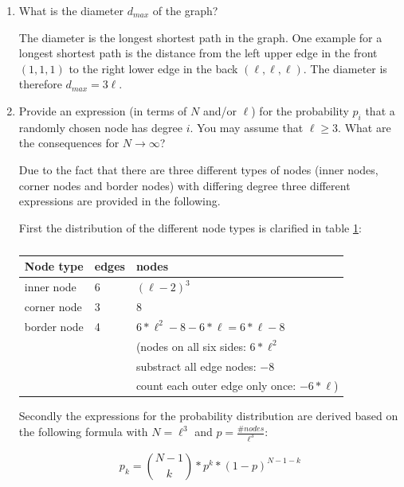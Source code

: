 \begin{enumerate}
	\item What is the diameter $d_{max}$ of the graph?
	\vspace{0.25cm}
	
	The diameter is the longest shortest path in the graph. One example for a longest shortest path is the distance from the left upper edge in the front $(1,1,1)$ to the right lower edge in the back $(\ell,\ell,\ell)$. The diameter is therefore $d_{max} = 3\ell$.
	
	\item Provide an expression (in terms of $N$ and/or $\ell$) for the probability $p_i$ that a randomly chosen node has degree $i$. You may assume that $\ell \geq 3$. What are the consequences for $N \rightarrow \infty$?
	\vspace{0.25cm}
	
	Due to the fact that there are three different types of nodes (inner nodes, corner nodes and border nodes) with differing degree three different expressions are provided in the following.
	
	\newpage
	
	First the distribution of the different node types is clarified in table \ref{tab:node_distribution}:
	
	\begin{table}[h]
	\centering
	\begin{tabular}{l|l|l}
		\hline
		\rowcolor{lightgray}
		Node type & edges & nodes \\ 
		\hline
		inner node    & 6 & $(\ell-2)^3$ \\
		\hline
		corner node    & 3 & $8$ \\
		\hline
		border node    & 4  & $6*\ell^2 - 8 - 6*\ell = 6*\ell - 8$ \\
		& & (nodes on all six sides: $6*\ell^2$ \\
		& & substract all edge nodes: $-8$ \\
		& & count each outer edge only once: $-6*\ell$) \\
		\hline
	\end{tabular}
	\caption{}
	\label{tab:node_distribution}
	\end{table}

	Secondly the expressions for the probability distribution are derived based on the following formula with $N=\ell^3$ and $p=\frac{\#nodes}{\ell^3}$:
	
	\begin{equation}
	p_k = {{N-1}\choose{k}} * p^k * (1-p)^{N-1-k}
	\end{equation}
	

\end{enumerate}
